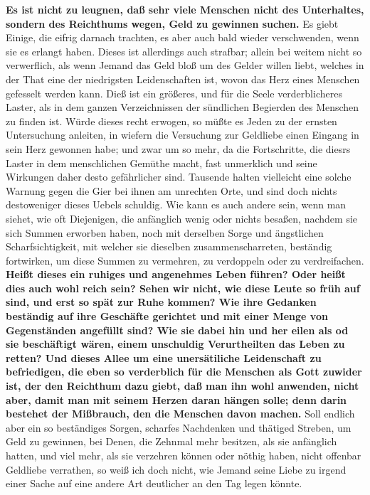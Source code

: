 \medskip

\textbf{Es ist nicht zu leugnen, daß sehr viele Menschen nicht des Unterhaltes, sondern
des Reichthums wegen, Geld zu gewinnen suchen.} Es giebt Einige, die eifrig
darnach trachten, es aber auch bald wieder verschwenden, wenn sie es erlangt
haben. Dieses ist allerdings auch strafbar; allein bei weitem nicht so
verwerflich, als wenn Jemand das Geld bloß um des Gelder willen liebt, welches
in der That eine der niedrigsten Leidenschaften ist, wovon das Herz eines
Menschen gefesselt werden kann. Dieß ist ein größeres, und für die Seele
verderblicheres Laster, als in dem ganzen Verzeichnissen der sündlichen
Begierden des Menschen zu finden ist. Würde dieses recht erwogen, so müßte es
Jeden zu der ernsten Untersuchung anleiten, in wiefern die Versuchung zur
Geldliebe einen Eingang in sein Herz gewonnen habe; und zwar um so mehr, da die
Fortschritte, die diesrs Laster in dem menschlichen Gemüthe macht, fast
unmerklich und seine Wirkungen daher desto gefährlicher sind. Tausende halten
vielleicht eine solche Warnung gegen die Gier bei ihnen am unrechten Orte, und
sind doch nichts destoweniger dieses Uebels schuldig. Wie kann es auch andere
sein, wenn man siehet, wie oft Diejenigen, die anfänglich wenig oder nichts
besaßen, nachdem sie sich Summen erworben haben, noch mit derselben Sorge und
ängstlichen Scharfsichtigkeit, mit welcher sie dieselben zusammenscharreten,
beständig fortwirken, um diese Summen zu vermehren, zu verdoppeln oder zu
verdreifachen. \textbf{Heißt dieses ein ruhiges und angenehmes Leben führen? Oder heißt
dies auch wohl reich sein? Sehen wir nicht, wie diese Leute so früh auf sind,
und erst so spät zur Ruhe kommen? Wie ihre Gedanken beständig auf ihre Geschäfte
gerichtet und mit einer Menge von Gegenständen angefüllt sind? Wie sie dabei hin
und her eilen als od sie beschäftigt wären, einem unschuldig Verurtheilten das
Leben zu retten? Und dieses Allee um eine unersätiliche Leidenschaft zu
befriedigen, die eben so verderblich für die Menschen als Gott zuwider ist, der
den Reichthum dazu giebt, daß man ihn wohl anwenden, nicht aber, damit man mit
seinem Herzen daran hängen solle; denn darin bestehet der Mißbrauch, den die
Menschen davon machen.} Soll endlich aber ein so beständiges Sorgen, scharfes
Nachdenken und thätiged Streben, um Geld zu gewinnen, bei Denen, die Zehnmal
mehr besitzen, als sie anfänglich hatten, und viel mehr, als sie verzehren
können oder nöthig haben, nicht offenbar Geldliebe verrathen, so weiß ich doch
nicht, wie Jemand seine Liebe zu irgend einer Sache auf eine andere Art
deutlicher an den Tag legen könnte.

